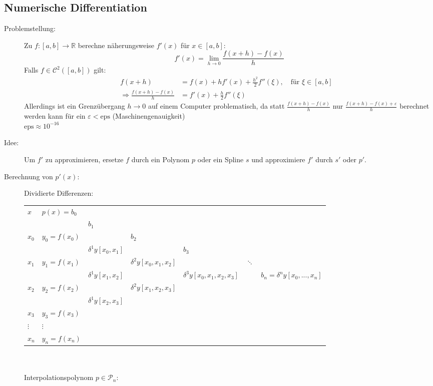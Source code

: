 \documentclass[12pt]{article}
\theoremstyle{break}
\begin{document}
\subsection{Numerische Differentiation}
\begin{description}
  \item[Problemstellung:] Zu $f: [a,b] \rightarrow \mathbb{R}$ berechne näherungsweise $f'(x)$ für $x \in [a,b]$:
  $$f'(x) = \lim_{h \rightarrow 0} \frac{f(x+h) - f(x)}{h}$$
  Falls $f \in \mathcal{C}^2([a,b])$ gilt:
  \begin{align*}
  f(x+h) &= f(x) + hf'(x) + \frac{h^2}{2} f''(\xi), \quad \text{für } \xi \in [a,b] &\\
  \Rightarrow \frac{f(x+h) - f(x)}{h} &= f'(x) + \frac{h}{2} f''(\xi)
  \end{align*}
  Allerdings ist ein Grenzübergang $h \rightarrow 0$ auf einem Computer problematisch, da statt $\frac{f(x+h) - f(x)}{h}$ nur $\frac{f(x+h) - f(x) + \varepsilon}{h}$ berechnet werden kann für ein $\varepsilon < \text{eps}$ (Maschinengenauigkeit) \\
  $\text{eps} \approx 10^{-16}$
  \item[Idee:] Um $f'$ zu approximieren, ersetze $f$ durch ein Polynom $p$ oder ein Spline $s$ und approximiere $f'$ durch $s'$ oder $p'$.
  \item[Berechnung von $p'(x)$:]  Dividierte Differenzen:\\
  \begin{tabular}{lllllll}
    $x$ & $p(x) = b_0$ \\
    &&$b_1$\\
	$x_0$ & $y_0 = f(x_0)$ && $b_2$\\
	 & & $\delta^1y[x_0, x_1]$&& $b_3$\\
	$x_1$ & $y_1 = f(x_1)$ & &$\delta^2y[x_0, x_1, x_2]$  &&$\ddots$\\
	 & & $\delta^1y[x_1, x_2]$ & & $\delta^3y[x_0, x_1, x_2, x_3]$&& $b_n = \delta^ny[x_0,...,x_n]$\\
	$x_2$ & $y_2 = f(x_2)$ & & $\delta^2y[x_1, x_2, x_3]$\\
	 & & $\delta^1y[x_2, x_3]$\\
	$x_3$ & $y_3 = f(x_3)$ \\
	$\vdots$ & $\vdots$\\
	$x_n$ & $y_n = f(x_n)$
  \end{tabular}\\\\
  Interpolationspolynom $p \in \mathcal{P}_n$:
  \begin{align*}

\end{align*}
\end{description}
\end{document}
